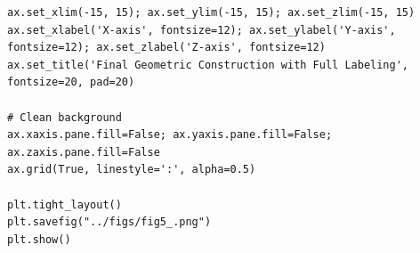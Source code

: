 \documentclass{beamer}
\theoremstyle{remark}
\numberwithin{equation}{section}
\begin{document}
\begin{frame}[fragile]
\begin{lstlisting}
ax.set_xlim(-15, 15); ax.set_ylim(-15, 15); ax.set_zlim(-15, 15)
ax.set_xlabel('X-axis', fontsize=12); ax.set_ylabel('Y-axis', fontsize=12); ax.set_zlabel('Z-axis', fontsize=12)
ax.set_title('Final Geometric Construction with Full Labeling', fontsize=20, pad=20)

# Clean background
ax.xaxis.pane.fill=False; ax.yaxis.pane.fill=False; ax.zaxis.pane.fill=False
ax.grid(True, linestyle=':', alpha=0.5)

plt.tight_layout()
plt.savefig("../figs/fig5_.png")
plt.show()
\end{lstlisting}
\end{frame}
\end{document}

